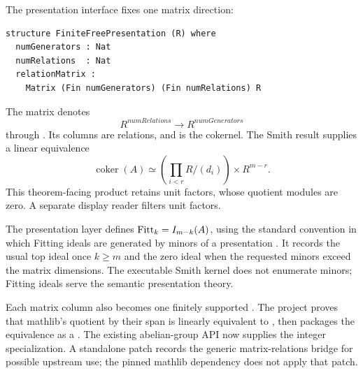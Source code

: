 The presentation interface fixes one matrix direction:

\begin{lstlisting}[style=leanstyle,caption={Finite-free presentation seam.}]
structure FiniteFreePresentation (R) where
  numGenerators : Nat
  numRelations  : Nat
  relationMatrix :
    Matrix (Fin numGenerators) (Fin numRelations) R
\end{lstlisting}

The matrix denotes
\[
  R^{\mathit{numRelations}}
    \longrightarrow R^{\mathit{numGenerators}}
\]
through . Its columns are relations, and
 is the cokernel. The Smith result supplies a linear
equivalence
\[
  \operatorname{coker}(A)
  \simeq
  \left(\prod_{i<r} R/(d_i)\right)
    \times R^{m-r}.
\]
This theorem-facing product retains unit factors, whose quotient modules are
zero. A separate display reader filters unit factors.

The presentation layer defines
\(\operatorname{Fitt}_k=\smash{I_{m-k}(A)}\), using the standard convention in
which Fitting ideals are generated by minors of a presentation
\citep[Definition 15.8.3]{stacksFittingIdeals}. It records the usual top ideal
once \(k\geq m\) and the zero ideal when the requested minors exceed the
matrix dimensions. The executable Smith kernel does not enumerate minors;
Fitting ideals serve the semantic presentation theory.

Each matrix column also becomes one finitely supported
. The project proves that mathlib's quotient
by their span is linearly equivalent to , then packages
the equivalence as a . The existing abelian-group
API now supplies the integer specialization. A standalone patch records the
generic matrix-relations bridge for possible upstream use; the pinned mathlib
dependency does not apply that patch.
